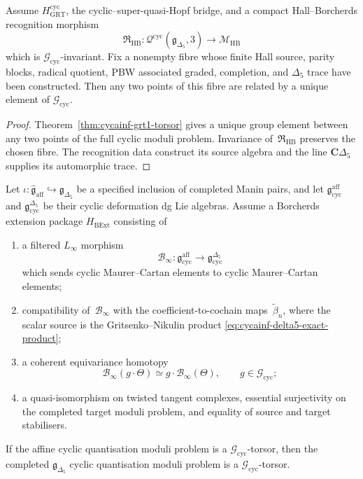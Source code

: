 \begin{corollary}
\label{cor:cycainf-h-delta5-cyclic-unique}
Assume $H_{\mathrm{GRT}}^{\mathrm{cyc}}$, the cyclic--super-quasi-Hopf
bridge, and a compact Hall--Borcherds recognition morphism
\[
 \mathfrak R_{\mathrm{HB}}\colon
 \mathcal Q^{\mathrm{cyc}}(\mathfrak g_{\Delta_5},3)
 \longrightarrow\mathcal M_{\mathrm{HB}}
\]
which is $\mathcal G_{\mathrm{cyc}}$-invariant.  Fix a nonempty fibre
whose finite Hall source, parity blocks, radical quotient, PBW
associated graded, completion, and $\Delta_5$ trace have been
constructed.  Then any two points of this fibre are related by a
unique element of $\mathcal G_{\mathrm{cyc}}$.
\end{corollary}

\begin{proof}
Theorem~\ref{thm:cycainf-grt1-torsor} gives a unique group element
between any two points of the full cyclic moduli problem.  Invariance
of~$\mathfrak R_{\mathrm{HB}}$ preserves the chosen fibre.  The
recognition data construct its source algebra and the line
$\mathbf C\Delta_5$ supplies its automorphic trace.
\end{proof}

\begin{lemma}
\label{lem:cycainf-borcherds-preserves-torsor}
Let
$\iota\colon\widehat{\mathfrak g}_{\mathrm{aff}}
\hookrightarrow\mathfrak g_{\Delta_5}$ be a specified inclusion of
completed Manin pairs, and let
$\mathfrak g_{\mathrm{cyc}}^{\mathrm{aff}}$ and
$\mathfrak g_{\mathrm{cyc}}^{\Delta_5}$ be their cyclic deformation dg
Lie algebras.  Assume a Borcherds extension package
$H_{\mathrm{BExt}}$ consisting of
\begin{enumerate}[label=\textup{(\roman*)}]
\item a filtered $L_\infty$ morphism
\[
 \mathcal B_\infty\colon
 \mathfrak g_{\mathrm{cyc}}^{\mathrm{aff}}
 \longrightarrow
 \mathfrak g_{\mathrm{cyc}}^{\Delta_5}
\]
which sends cyclic Maurer--Cartan elements to cyclic
Maurer--Cartan elements;
\item compatibility of~$\mathcal B_\infty$ with the
coefficient-to-cochain maps~$\widetilde\beta_n$, where the scalar source is the
Gritsenko--Nikulin product
\eqref{eq:cycainf-delta5-exact-product};
\item a coherent equivariance homotopy
\[
 \mathcal B_\infty(g\cdot\Theta)
 \simeq g\cdot\mathcal B_\infty(\Theta),
 \qquad g\in\mathcal G_{\mathrm{cyc}};
\]
\item a quasi-isomorphism on twisted tangent complexes, essential
surjectivity on the completed target moduli problem, and equality of
source and target stabilisers.
\end{enumerate}
If the affine cyclic quantisation moduli problem is a
$\mathcal G_{\mathrm{cyc}}$-torsor, then the completed
$\mathfrak g_{\Delta_5}$ cyclic quantisation moduli problem is a
$\mathcal G_{\mathrm{cyc}}$-torsor.
\end{lemma}

